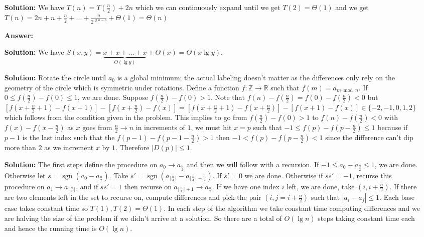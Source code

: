 \documentclass[12pt,twoside]{article}
\newcommand{\sgn}{\operatorname{sgn}}
\begin{document}
\begin{problems}
\begin{problemparts}
\begin{itemize}
\item [\textbf{Solution:}] We have $T(n)=T(\frac{n}{2})+2n$ which we can continuously expand until we get $T(2)=\Theta(1)$ and we get $T(n)=2n+n+\frac{n}{2} + ... + \frac{n}{2^{\lg n-3}} +\Theta(1)=\Theta(n)$
\end{itemize}
\problempart
\begin{itemize}
\item [\textbf{Answer:}] 
\item [\textbf{Solution:}] We have $S(x,y)= \underbrace{x + x +...+x}_{\text{$\Theta(\lg y)$}} +\Theta(x)=\Theta(x\lg y)$.
\end{itemize}
\end{problemparts}
\problem
\begin{problemparts}
\problempart
\begin{itemize}
\item [\textbf{Solution:}] Rotate the circle until $a_0$ is a global minimum; the actual labeling doesn't matter as the differences only rely on the geometry of the circle which is symmetric under rotations. Define a function $f: \mathbb{Z} \rightarrow \mathbb{R}$ such that $f(m)=a_{m\bmod n}$. If $0 \leq f(\frac{n}{2})-f(0) \leq 1$, we are done. Suppose $f(\frac{n}{2})-f(0) > 1$. Note that $f(n)-f(\frac{n}{2})=f(0)-f(\frac{n}{2})< 0$ but $[f(x+\frac{n}{2}+1)-f(x+1)] - [f(x+\frac{n}{2})-f(x)]=[f(x+\frac{n}{2}+1)-f(x+\frac{n}{2})]-[f(x+1)-f(x)]\in\{-2,-1,0,1,2\}$ which follows from the condition given in the problem. This implies to go from $f(\frac{n}{2})-f(0) > 1$ to $f(n)-f(\frac{n}{2}) < 0$ with $f(x)-f(x-\frac{n}{2})$ as $x$ goes from $\frac{n}{2}\rightarrow n$ in increments of $1$, we must hit $x=p$ such that $-1 \leq f(p)-f(p-\frac{n}{2}) \leq 1$ because if $p-1$ is the last index such that the $f(p-1)-f(p-1-\frac{n}{2})> 1$ then $-1<f(p)-f(p-\frac{n}{2})<1$ since the difference can't dip more than $2$ as we increment $x$ by $1$. Therefore $|D(p)| \leq 1$.
\end{itemize}
\problempart
\begin{itemize}
\item [\textbf{Solution:}] The first steps define the procedure on $a_0\rightarrow a_{\frac{n}{2}}$ and then we will follow with a recursion. If $-1 \leq a_{0}-a_{\frac{n}{2}} \leq 1$, we are done. Otherwise let $s=\sgn (a_{0}-a_{\frac{n}{2}})$. Take $s'=\sgn(a_{\lfloor\frac{n}{4}\rfloor}-a_{\lfloor\frac{n}{4}\rfloor+\frac{n}{2}})$. If $s'=0$ we are done. Otherwise if $ss'=-1$, recurse this procedure on $a_1\rightarrow a_{\lfloor \frac{n}{4} \rfloor}$, and if $ss'=1$ then recurse on $a_{\lfloor \frac{n}{4} \rfloor+1}\rightarrow a_{\frac{n}{2}}$. If we have one index $i$ left, we are done, take $(i, i+\frac{n}{2})$. If there are two elements left in the set to recurse on, compute differences and pick the pair $(i,j=i+\frac{n}{2})$ such that $|a_i-a_j| \leq 1$. Each base case takes constant time so $T(1),T(2)=\Theta(1)$. In each step of the algorithm we take constant time computing differences and we are halving the size of the problem if we didn't arrive at a solution. So there are a  total of $O(\lg n)$ steps taking constant time each and hence the running time is $\boxed{O(\lg n)}$.

\end{itemize}
\end{problemparts}
\end{problems}
\end{document}
